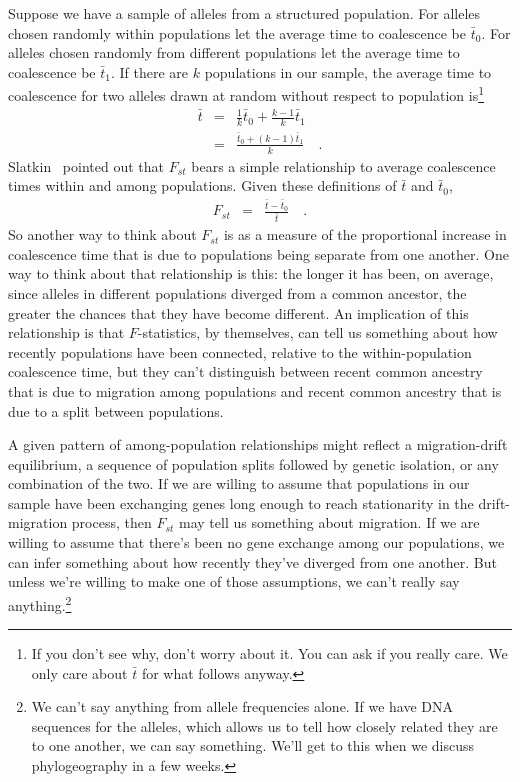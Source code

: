\documentclass[12pt]{article}
\begin{document}
Suppose we have a sample of alleles from a structured population. For
alleles chosen randomly within populations let the average time to
coalescence be $\bar t_0$. For alleles chosen randomly from different
populations let the average time to coalescence be $\bar t_1$. If
there are $k$ populations in our sample, the average time to
coalescence for two alleles drawn at random without respect to
population is\footnote{If you don't see why, don't worry about it. You
can ask if you really care. We only care about $\bar t$ for what
follows anyway.}
\begin{eqnarray*}
  \bar t &=& \frac{1}{k}\bar t_0 + \frac{k-1}{k}\bar t_1 \\
  &=& \frac{\bar t_0 + (k-1)\bar t_1}
              {k} \quad .
\end{eqnarray*}
Slatkin~\cite{Slatkin-1991} pointed out that $F_{st}$ bears a simple
relationship to average coalescence times within and among
populations. Given these definitions of $\bar t$ and $\bar t_0$,
\begin{eqnarray*}
  F_{st} &=& \frac{\bar t - \bar t_0}{\bar t} \quad .
\end{eqnarray*}
So another way to think about $F_{st}$ is as a measure of the
proportional increase in coalescence time that is due to populations
being separate from one another. One way to think about that
relationship is this: the longer it has been, on average, since
alleles in different populations diverged from a common ancestor, the
greater the chances that they have become different. An implication of
this relationship is that $F$-statistics, by themselves, can tell us
something about how recently populations have been connected, relative
to the within-population coalescence time, but they can't distinguish
between recent common ancestry that is due to migration among
populations and recent common ancestry that is due to a split between
populations.

A given pattern of among-population relationships might reflect a
migration-drift equilibrium, a sequence of population splits followed
by genetic isolation, or any combination of the two. If we are willing
to assume that populations in our sample have been exchanging genes
long enough to reach stationarity in the drift-migration process, then
$F_{st}$ may tell us something about migration. If we are willing to
assume that there's been no gene exchange among our populations, we
can infer something about how recently they've diverged from one
another. But unless we're willing to make one of those assumptions, we
can't really say anything.\footnote{We can't say anything from allele
  frequencies alone. If we have DNA sequences for the alleles, which
  allows us to tell how closely related they are to one another, we
  can say something. We'll get to this when we discuss phylogeography
  in a few weeks.}
\end{document}
